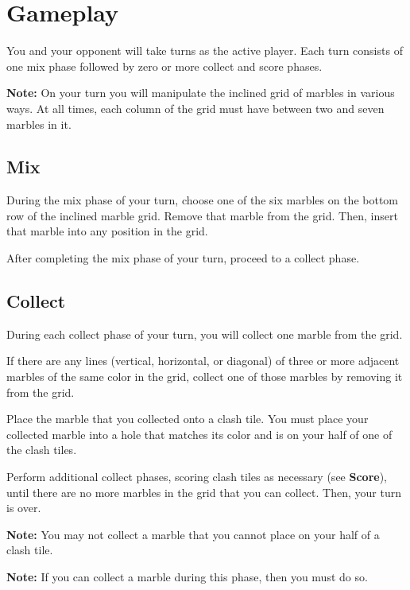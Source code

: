 \section*{Gameplay}
You and your opponent will take turns as the active player.
Each turn consists of one mix phase followed by zero or more collect and score phases.

\textbf{Note:} On your turn you will manipulate the inclined grid of marbles in various ways.
At all times, each column of the grid must have between two and seven marbles in it.

\subsection*{Mix}
During the mix phase of your turn, choose one of the six marbles on the bottom row of the inclined marble grid.
Remove that marble from the grid. Then, insert that marble into any position in the grid.

After completing the mix phase of your turn, proceed to a collect phase.
%

\newpage

\subsection*{Collect}
During each collect phase of your turn, you will collect one marble from the grid.

If there are any lines (vertical, horizontal, or diagonal) of three or more adjacent marbles of the same color in the grid, collect one of those marbles by removing it from the grid.

Place the marble that you collected onto a clash tile.
You must place your collected marble into a hole that matches its color and is on your half of one of the clash tiles.

Perform additional collect phases, scoring clash tiles as necessary (see \textbf{Score}), until there are no more marbles in the grid that you can collect. Then, your turn is over.

\textbf{Note:} You may not collect a marble that you cannot place on your half of a clash tile.


\textbf{Note:} If you can collect a marble during this phase, then you must do so. 


